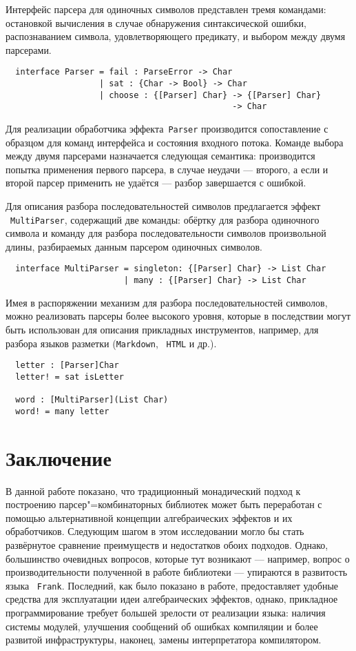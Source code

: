 \documentclass [a4paper] {article}
\begin{document}
Интерфейс парсера для одиночных символов представлен тремя командами: остановкой
вычисления в случае обнаружения синтаксической ошибки, распознаванием символа,
удовлетворяющего предикату, и выбором между двумя парсерами.
\begin{verbatim}
  interface Parser = fail : ParseError -> Char
                   | sat : {Char -> Bool} -> Char
                   | choose : {[Parser] Char} -> {[Parser] Char}
                                              -> Char
\end{verbatim}

Для реализации обработчика эффекта~\texttt{Parser} производится
сопоставление с образцом для команд интерфейса и состояния входного потока.
Команде выбора между двумя парсерами назначается следующая семантика:
производится попытка применения первого парсера, в случае неудачи --- второго, а
если и второй парсер применить не удаётся --- разбор завершается с ошибкой.

Для описания разбора последовательностей символов предлагается эффект
~\texttt{MultiParser}, содержащий две команды: обёртку для разбора одиночного
символа и команду для разбора последовательности символов произвольной длины,
разбираемых данным парсером одиночных символов.
\begin{verbatim}
  interface MultiParser = singleton: {[Parser] Char} -> List Char
                        | many : {[Parser] Char} -> List Char
\end{verbatim}

Имея в распоряжении механизм для разбора последовательностей символов, можно
реализовать парсеры более высокого уровня, которые в последствии могут быть
использован для описания прикладных инструментов, например, для разбора
языков разметки (\texttt{Markdown}, ~\texttt{HTML} и др.).
\begin{verbatim}
  letter : [Parser]Char
  letter! = sat isLetter

  word : [MultiParser](List Char)
  word! = many letter
\end{verbatim}

\section*{Заключение}

В данной работе показано, что традиционный монадический подход к построению парсер"=комбинаторных библиотек может быть переработан с помощью альтернативной концепции алгебраических эффектов и их обработчиков. Следующим шагом в этом исследовании могло бы стать развёрнутое сравнение преимуществ и недостатков обоих подходов. Однако, большинство очевидных вопросов, которые тут возникают --- например, вопрос о производительности полученной в работе библиотеки --- упираются в развитость языка ~\texttt{Frank}. Последний, как было показано в работе, предоставляет удобные средства для эксплуатации
идеи алгебраических эффектов, однако, прикладное программирование требует большей
зрелости от реализации языка: наличия системы модулей, улучшения сообщений об
ошибках компиляции и более развитой инфраструктуры, наконец, замены интерпретатора компилятором.


{}

\end{document}
